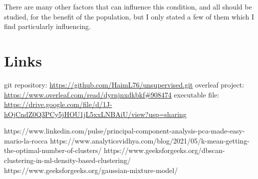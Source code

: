 \documentclass{article}
\begin{document}
There are many other factors that can influence this condition, and all should be studied, for the benefit of the population, but I only stated a few of them which I find particularly influencing.

\section{Links}
git repository: \url{https://github.com/HaimL76/unsupervised.git}\newline
overleaf project: \url{https://www.overleaf.com/read/dyrnjnxdkbkf#908474}\newline
executable file: \url{https://drive.google.com/file/d/1J-hOjCndZ0Q3PCy5jHOU1jL5xxLNBAiU/view?usp=sharing}

\begin{thebibliography}{2}
https://www.linkedin.com/pulse/principal-component-analysis-pca-made-easy-mario-la-rocca
https://www.analyticsvidhya.com/blog/2021/05/k-mean-getting-the-optimal-number-of-clusters/
https://www.geeksforgeeks.org/dbscan-clustering-in-ml-density-based-clustering/
https://www.geeksforgeeks.org/gaussian-mixture-model/
\end{thebibliography}
\end{document}
